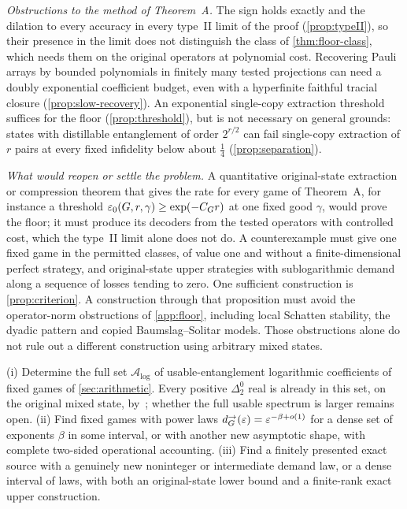 \emph{Obstructions to the method of Theorem~A.} The sign holds exactly and the dilation to every accuracy in every type~II limit of
the proof (\cref{prop:typeII}), so their presence in the limit does not distinguish the class of \cref{thm:floor-class}, which needs them on the
original operators at polynomial cost. Recovering Pauli arrays by bounded polynomials in finitely many tested projections can need a
doubly exponential coefficient budget, even with a hyperfinite faithful tracial closure (\cref{prop:slow-recovery}). An exponential
single-copy extraction threshold suffices for the floor (\cref{prop:threshold}), but is not necessary on general grounds: states with
distillable entanglement of order $2^{r/2}$ can fail single-copy extraction of $r$ pairs at every fixed infidelity below about
$\frac14$ (\cref{prop:separation}).

\emph{What would reopen or settle the problem.} A quantitative original-state extraction or compression theorem that gives the rate
for every game of Theorem~A, for instance a threshold $\varepsilon_0(G,r,\gamma)\ge\exp(-C_Gr)$ at one fixed good $\gamma$, would prove the
floor; it must produce its decoders from the tested operators with controlled cost, which the type~II limit alone does not do. A
counterexample must give one fixed game in the permitted classes, of value one and without a finite-dimensional perfect strategy, and
original-state upper strategies with sublogarithmic demand along a sequence of losses tending to zero. One sufficient construction is
\cref{prop:criterion}. A construction through that proposition must avoid the operator-norm obstructions of \cref{app:floor}, including
local Schatten stability, the dyadic pattern and copied Baumslag--Solitar models. Those obstructions alone do not rule out a different
construction using arbitrary mixed states.

\begin{problem}\label{prob:dense}
(i) Determine the full set $\mathcal A_{\log}$ of usable-entanglement logarithmic coefficients of fixed games of \cref{sec:arithmetic}. Every positive $\Delta^0_2$ real is already in this set, on the original mixed state, by~\cite[Theorems~1.1 and~16.6, Corollary~16.7]{DM-U3}; whether the full usable spectrum is larger remains open. (ii) Find fixed games with
power laws $d^\to_G(\varepsilon)=\varepsilon^{-\beta+o(1)}$ for a dense set of exponents $\beta$ in some interval, or with another new asymptotic shape,
with complete two-sided operational accounting. (iii) Find a finitely presented exact source with a genuinely new noninteger or
intermediate demand law, or a dense interval of laws, with both an original-state lower bound and a finite-rank exact upper construction.
\end{problem}

